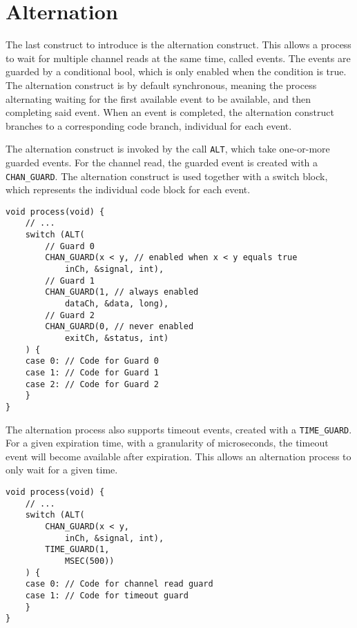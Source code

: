 \section*{Alternation}

The last construct to introduce is the alternation construct. This allows a process to wait for multiple channel reads at the same time, called events. The events are guarded by a conditional bool, which is only enabled when the condition is true. The alternation construct is by default synchronous, meaning the process alternating waiting for the first available event to be available, and then completing said event. When an event is completed, the alternation construct branches to a corresponding code branch, individual for each event.

The alternation construct is invoked by the call \texttt{ALT}, which take one\hyp{}or\hyp{}more guarded events. For the channel read, the guarded event is created with a \texttt{CHAN\_GUARD}. The alternation construct is used together with a switch block, which represents the individual code block for each event.

\begin{lstlisting}[style={CustomC},caption={Alternation construct setup with channel read guards}]
void process(void) {
    // ...
    switch (ALT(
        // Guard 0
        CHAN_GUARD(x < y, // enabled when x < y equals true
            inCh, &signal, int),
        // Guard 1
        CHAN_GUARD(1, // always enabled
            dataCh, &data, long),
        // Guard 2
        CHAN_GUARD(0, // never enabled
            exitCh, &status, int)
    ) {
    case 0: // Code for Guard 0 
    case 1: // Code for Guard 1 
    case 2: // Code for Guard 2 
    }
}
\end{lstlisting}

The alternation process also supports timeout events, created with a \texttt{TIME\_GUARD}. For a given expiration time, with a granularity of microseconds, the timeout event will become available after expiration. This allows an alternation process to only wait for a given time. 

\noindent\begin{minipage}{\textwidth}
\begin{lstlisting}[style={CustomC},caption={Alternation construct with timeout}]
void process(void) {
    // ...
    switch (ALT(
        CHAN_GUARD(x < y, 
            inCh, &signal, int),
        TIME_GUARD(1,
            MSEC(500))
    ) {
    case 0: // Code for channel read guard 
    case 1: // Code for timeout guard
    }
}
\end{lstlisting}
\end{minipage}


